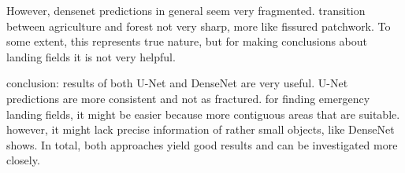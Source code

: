 {However, densenet predictions in general seem very fragmented. transition between agriculture and forest not very sharp, more like fissured patchwork. To some extent, this represents true nature, but for making conclusions about landing fields it is not very helpful. 

conclusion: results of both U-Net and DenseNet are very useful. U-Net predictions are more consistent and not as fractured. for finding emergency landing fields, it might be easier because more contiguous areas that are suitable. however, it might lack precise information of rather small objects, like DenseNet shows. In total, both approaches yield good results and can be investigated more closely. 

\begin{figure}
    \newcommand{\DiscussionImageWidth}{0.23\textwidth}
    \centering


\end{figure}}

